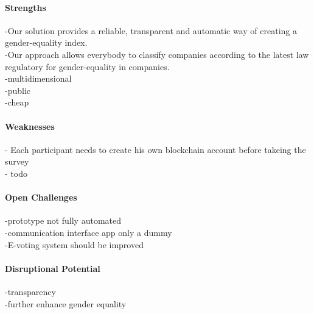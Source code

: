 \paragraph*{Strengths}
-Our solution provides a reliable, transparent and automatic way of creating a gender-equality index.\\
-Our approach allows everybody to classify companies according to the latest law regulatory for gender-equality in companies.\\
-multidimensional\\
-public\\
-cheap\\

\paragraph*{Weaknesses}
- Each participant needs to create his own blockchain account before takeing the survey\\
- todo

\paragraph*{Open Challenges}
-prototype not fully automated\\
-communication interface app only a dummy\\
-E-voting system should be improved\\

	
\paragraph*{Disruptional Potential}
-transparency\\
-further enhance gender equality